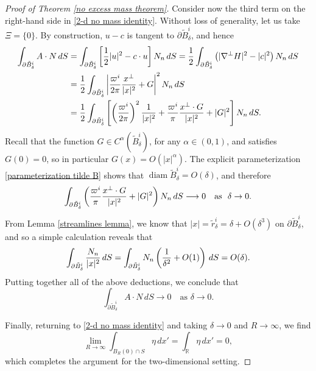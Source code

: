 \documentclass[11pt,reqno]{amsart}
\newcommand{\diam}[1]{\operatorname{diam}{#1}}
\theoremstyle{plain}
\theoremstyle{remark}
\numberwithin{equation}{section}
\begin{document}
\begin{proof}[Proof of Theorem \ref{no excess mass theorem}]
  Consider now the third term on the right-hand side in \eqref{2-d no mass identity}.  Without loss of generality, let us take $\Xi = \{ 0 \}$.  By construction, $u-c$ is tangent to $\partial \tilde B_\delta^i$, and hence 
\begin{align*}
\int_{\partial \tilde B^i_\delta} A \cdot N \, dS & =  \int_{\partial \tilde B^i_\delta}  \left[ {1\over 2}|u|^2 - c\cdot u \right] N_n \, dS = {1\over 2} \int_{\partial \tilde B^i_\delta} \left( |\nabla^\perp H|^2 - |c|^2 \right) N_n \, dS \\
& = {1\over 2} \int_{\partial \tilde B^i_\delta} \left| {\varpi^i \over 2\pi} {x^\perp\over |x|^2} + G \right|^2 N_n \, dS \\
& = {1\over 2} \int_{\partial \tilde B^i_\delta} \left[ \left( {\varpi^i \over 2\pi} \right)^2 {1\over |x|^2} + {\varpi^i \over \pi} {x^\perp \cdot G \over |x|^2} +|G|^2 \right] N_n \, dS.
\end{align*}
Recall that the function $G\in C^{\alpha}(\tilde B^i_\delta)$, for any $\alpha \in (0,1)$, and satisfies $G(0) = 0$,  so in particular $G(x) = O(|x|^{\alpha})$. The explicit parameterization \eqref{parameterization tilde B} shows that $\diam{\tilde{B}_\delta^i} = O(\delta)$, and therefore 
\[
\int_{\partial \tilde B^i_\delta} \left( {\varpi^i \over \pi} {x^\perp \cdot G \over |x|^2} +|G|^2 \right) N_n \, dS \longrightarrow 0 \quad \text{as } \ \delta \to 0.
\]
From Lemma \ref{streamlines lemma}, we know that $|x| = \tilde r_\delta^i = \delta + O(\delta^3)$ on $\partial \tilde B_\delta^i$, and so a simple calculation reveals that 
\begin{align*}
\int_{\partial \tilde B^i_\delta} {N_n \over |x|^2} \, dS = \int_{\partial \tilde B^i_\delta} N_n\left( {1 \over \delta^2} + O(1) \right) \, dS = O(\delta).
\end{align*}
Putting together all of the above deductions, we conclude that
\[
  \int_{\partial \tilde B^i_\delta}  A \cdot N \, dS \longrightarrow 0 \quad \text{as } \delta \to 0.
\]
 
  Finally, returning to \eqref{2-d no mass identity} and taking $\delta \to 0$ and $R \to \infty$, we find      
  \[
  \lim_{R\to \infty} \int_{B_R(0) \cap S} \eta\, dx' 
  = \int_{\mathbb R} \eta \, dx' 
  = 0,
  \]
  which completes the argument for the two-dimensional setting.      


\end{proof}
\end{document}
